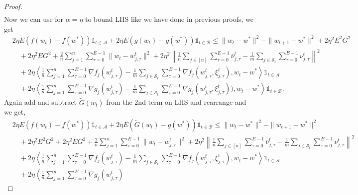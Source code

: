 \documentclass{article} %
\def\A{{\mathcal A}}
\def\B{{\mathcal B}}
\def\S{{\mathcal S}}
\begin{document}
\begin{proof}
\begin{align*}
         \end{align*}
    Now we can use  for $\alpha = \eta$ to bound LHS like we have done in previous proofs, we get
    \begin{equation*}
    \begin{aligned}
        &2\eta E(f(w_t) - f(w^*) )\mathds{1}_{t \in \A} + 2\eta E(g(w_t) - g(w^*))\mathds{1}_{t \in \B} \leq \|w_t - w^*\|^2 - \|w_{t+1} - w^*\|^2 + 2\eta^2 E^2 G^2 
        \\
        & \quad + 2\eta^2EG^2 + \frac{2}{n} \sum_{j=1}^n \sum_{\tau=0}^{E-1} \| w_t - w_{j,\tau}^t \|^2 + 2\eta^2 \left\|\frac{1}{n} \sum_{j \in [n]}  \sum_{\tau=0}^{E-1} \bar{\nu}_{j,\tau}^t - \frac{1}{m} \sum_{j \in \S_t}  \sum_{\tau=0}^{E-1} \nu_{j,\tau}^t \right\|^2
        \\
        &\quad + 2\eta \left\langle \frac{1}{n} \sum_{j=1}^{n} \sum_{\tau=0}^{E-1} \nabla f_j(w_{j,\tau}^t) 
        - \frac{1}{m} \sum_{j \in \S_t} \sum_{\tau=0}^{E-1} \nabla f_j(w_{j,\tau}^t, \xi_{j,\tau}^t), w_t - w^* \right\rangle \mathds{1}_{t \in \A} \\
        &\quad + 2\eta \left\langle \frac{1}{n} \sum_{j=1}^{n} \sum_{\tau=0}^{E-1} \nabla g_j(w_{j,\tau}^t) 
        - \frac{1}{m} \sum_{j \in \S_t} \sum_{\tau=0}^{E-1} \nabla g_j(w_{j,\tau}^t, \xi_{j,\tau}^t)), w_t - w^* \right\rangle \mathds{1}_{t \in \B}.
    \end{aligned}
    \end{equation*}
    Again add and subtract $\tilde{G}(w_t)$ from the 2nd term on LHS and rearrange and we get,
    \begin{equation*}
    \begin{aligned}
        &2\eta E(f(w_t) - f(w^*) )\mathds{1}_{t \in \A} + 2\eta E(\tilde{G}(w_t) - g(w^*))\mathds{1}_{t \in \B} \leq \|w_t - w^*\|^2 - \|w_{t+1} - w^*\|^2 
        \\
        & \quad + 2\eta^2 E^2 G^2 + 2\eta^2 E G^2 + \frac{2}{n} \sum_{j=1}^n \sum_{\tau=0}^{E-1} \| w_t - w_{j,\tau}^t \|^2 + 2\eta^2 \left\|\frac{1}{n} \sum_{j \in [n]}  \sum_{\tau=0}^{E-1} \bar{\nu}_{j,\tau}^t - \frac{1}{m} \sum_{j \in \S_t}  \sum_{\tau=0}^{E-1} \nu_{j,\tau}^t \right\|^2
        \\
        &\quad + 2\eta \left\langle \frac{1}{n} \sum_{j=1}^{n} \sum_{\tau=0}^{E-1} \nabla f_j(w_{j,\tau}^t) 
        - \frac{1}{m} \sum_{j \in \S_t} \sum_{\tau=0}^{E-1} \nabla f_j(w_{j,\tau}^t, \xi_{j,\tau}^t), w_t - w^* \right\rangle \mathds{1}_{t \in \A} \\
        &\quad + 2\eta \left\langle \frac{1}{n} \sum_{j=1}^{n} \sum_{\tau=0}^{E-1} \nabla g_j(w_{j,\tau}^t) 

\end{aligned}
\end{equation*}
\end{proof}
\end{document}
